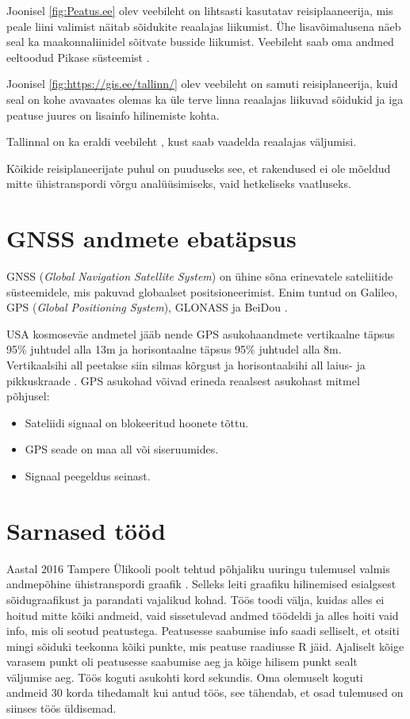 Joonisel \ref{fig:Peatus.ee} olev veebileht  on lihtsasti kasutatav reisiplaaneerija, mis peale liini valimist näitab sõidukite reaalajas liikumist. Ühe lisavõimalusena näeb seal ka maakonnaliinidel sõitvate busside liikumist. Veebileht saab oma andmed eeltoodud Pikase süsteemist \cite{tallinn_infosusteem_2017}.


Joonisel \ref{fig:https://gis.ee/tallinn/} olev veebileht on samuti reisiplaneerija, kuid seal on kohe avavaates olemas ka üle terve linna reaalajas liikuvad sõidukid ja iga peatuse juures on lisainfo hilinemiste kohta.

Tallinnal on ka eraldi veebileht \cite{transportTallinnEe}, kust saab vaadelda reaalajas väljumisi. 

Kõikide reisiplaneerijate puhul on puuduseks see, et rakendused ei ole mõeldud mitte ühistranspordi võrgu analüüsimiseks, vaid hetkeliseks vaatluseks.


\section{GNSS andmete ebatäpsus}

GNSS (\textit{Global Navigation Satellite System}) on ühine sõna erinevatele sateliitide süsteemidele, mis pakuvad globaalset positsioneerimist. Enim tuntud on Galileo, GPS (\textit{Global Positioning System}), GLONASS ja BeiDou \cite{euspa_gnss}. 

USA kosmoseväe andmetel jääb nende GPS asukohaandmete vertikaalne täpsus 95\% juhtudel alla 13m ja horisontaalne täpsus 95\% juhtudel alla 8m. Vertikaalsihi all peetakse siin silmas kõrgust ja horisontaalsihi all laius- ja pikkuskraade \cite{GPS_performance}. 
GPS asukohad võivad erineda reaalsest asukohast mitmel põhjusel:
\begin{itemize}
    \item Sateliidi signaal on blokeeritud hoonete tõttu.
    \item GPS seade on maa all või siseruumides.
    \item Signaal peegeldus seinast.
\end{itemize}

\section{Sarnased tööd}

Aastal 2016  Tampere Ülikooli poolt tehtud põhjaliku uuringu tulemusel valmis andmepõhine ühistranspordi graafik \cite{Syrjarinne2015}. Selleks leiti graafiku hilinemised esialgsest sõidugraafikust ja parandati vajalikud kohad. Töös toodi välja, kuidas alles ei hoitud mitte kõiki andmeid, vaid sissetulevad andmed töödeldi ja alles hoiti vaid info, mis oli seotud peatustega. Peatusesse saabumise info saadi selliselt, et otsiti mingi sõiduki teekonna kõiki punkte, mis peatuse raadiusse R jäid. Ajaliselt kõige varasem punkt oli peatusesse saabumise aeg ja kõige hilisem punkt sealt väljumise aeg. Töös koguti asukohti kord sekundis. Oma olemuselt koguti andmeid 30 korda tihedamalt kui antud töös, see tähendab, et osad tulemused on siinses töös üldisemad.

